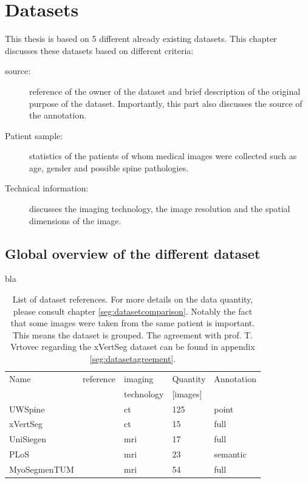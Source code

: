 \chapter{Datasets\label{sec:datasets}}

This thesis is based on 5 different already existing datasets.
This chapter discusses these datasets based on different criteria:

\begin{description}
    \item[source:] reference of the owner of the dataset and brief description of the original purpose of the dataset. Importantly, this part also discusses the source of the annotation.
    \item[Patient sample:] statistics of the patients of whom medical images were collected such as age, gender and possible spine pathologies.
    \item[Technical information:] discusses the imaging technology, the image resolution and the spatial dimensions of the image. 
\end{description}

\section{Global overview of the different dataset}




bla

\begin{table}
 
    \begin{tabular}{ l l l l l} 
     \hline
     \hline
     Name & reference & imaging & Quantity & Annotation \\
          &           & technology & [images] & \\
     \hline 
    UWSpine & \cite{Glocker}  & \acrshort{ct} & 125 & point  \\ 
    xVertSeg & \cite{Ibragimov2014, Korez2015} & \acrshort{ct} & 15 & full \\
    UniSiegen  & \cite{Zukic2014} & \acrshort{mri} & 17 & full \\
    PLoS & \cite{Chu2015} & \acrshort{mri} & 23 & semantic \\
    MyoSegmenTUM & \cite{Burian2019} & \acrshort{mri} &  54 & full \\
     \hline
     \hline
    \end{tabular}
    \caption{List of dataset references. For more details on the data quantity, please consult chapter \ref{seg:datasetcomparison}. 
    Notably the fact that some images were taken from the same patient is important. This means the dataset is grouped. 
    The agreement with prof. T. Vrtovec regarding the xVertSeg dataset can be found in appendix \ref{seg:datasetagreement}.}

\end{table}

